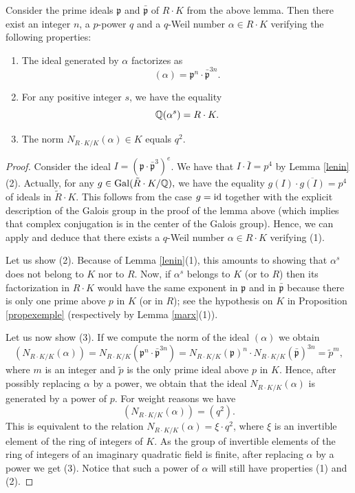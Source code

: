 \begin{lemma}
\notready\label{engels}
Consider the prime ideals $\mathfrak{p}$ and $\bar{\mathfrak{p}}$ of  $R\cdot K$ from the above lemma. Then there exist an integer $n$, a $p$-power $q$ and a $q$-Weil number $\alpha\in R\cdot K$ verifying the following properties:
\begin{enumerate}
 \item The ideal generated by $\alpha$ factorizes as
\[(\alpha)=\mathfrak{p}^n\cdot \bar{\mathfrak{p}}^{3n}.\]
\item For any positive integer $s$, we have the equality
\[\mathbb{Q}(\alpha^s)= R\cdot K.\]
\item The norm $N_{R\cdot K/K}(\alpha)\in K$ equals $q^2$.
\end{enumerate}
\end{lemma}
\begin{proof}
Consider the ideal $I=(\mathfrak{p}\cdot \bar{\mathfrak{p}}^{3})^e $. We have that $I \cdot \bar{I}= p^4$ by Lemma \ref{lenin}(2). Actually, for any $g\in\textnormal{Gal}(\tilde{R}\cdot K/\mathbb{Q}),$ we have the equality ${g(I) \cdot \overline{g(I)}= p^4}$ of ideals in $\tilde{R}\cdot K$. This follows from the case $g=\mathrm{id}$ together with the explicit description of the Galois group in the proof of the lemma above (which implies that complex conjugation is in the center of the Galois group). Hence, we can apply  \cite[Lemma 1]{Honda} and deduce that there exists a  $q$-Weil number $\alpha\in R\cdot K$ verifying (1).





Let us show (2). Because of Lemma \ref{lenin}(1), this amounts to showing that $\alpha^s$ does not belong to $K$ nor to $R$. Now, if  $\alpha^s$ belongs to $K$ (or to $R$) then its factorization in $R\cdot K$ would have the same exponent in $\mathfrak{p}$ and in $\bar{\mathfrak{p}}$ because there is only one prime above $p$ in $K$ (or in $R$); see the hypothesis on $K$ in Proposition \ref{propexemple} (respectively by Lemma \ref{marx}(1)).


Let us now show (3). If we compute the  norm of the ideal $(\alpha)$ we obtain
\[ (N_{R\cdot K/K} (\alpha))= N_{R\cdot K/K} (\mathfrak{p}^n\cdot \bar{\mathfrak{p}}^{3n}) = N_{R\cdot K/K} (\mathfrak{p})^n\cdot N_{R\cdot K/K} ( \bar{\mathfrak{p}})^{3n}= \tilde{p}^m,\]
where $m$ is an integer and $\tilde{p}$ is the only prime ideal above $p$ in $K$. Hence, after possibly replacing $\alpha$ by a power, we obtain that the ideal $N_{R\cdot K/K} (\alpha)$ is generated by a power of $p$. For weight reasons we have
\[(N_{R\cdot K/K} (\alpha)) = (q^2).\]
This is equivalent to the relation $N_{R\cdot K/K} (\alpha) = \xi \cdot q^2$, where $\xi$ is an invertible element of the ring of integers of $K$. As the group of  invertible elements of the ring of integers of an  imaginary quadratic field is finite, after replacing $\alpha$ by a power we get (3). Notice that such a power of $\alpha$ will still have properties (1) and (2).
\end{proof}

